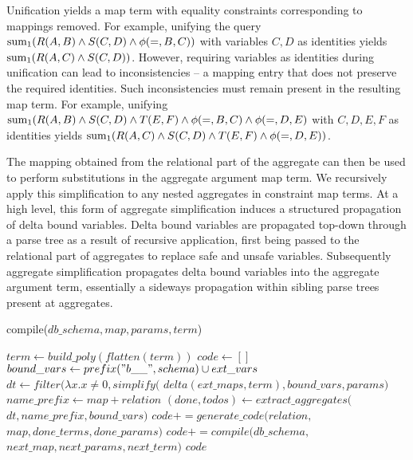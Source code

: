 Unification yields a map term with equality constraints corresponding
to mappings removed. 
For example, unifying the query
$\mathrm{sum}_{1}(R(A,B) \wedge S(C,D) \wedge \phi(=,B,C))$
with variables $C,D$ as identities yields $\mathrm{sum}_{1}(R(A,C) \wedge S(C,D))$.
However, requiring variables as identities during
unification can lead to inconsistencies -- a mapping entry that does not
preserve the required identities. Such inconsistencies must remain present in
the resulting map term.
For example, unifying
$\mathrm{sum}_{1}(R(A,B) \wedge S(C,D) \wedge T(E,F) \wedge \phi(=,B,C) \wedge
\phi(=,D,E)$ with $C,D,E,F$ as identities yields
 $\mathrm{sum}_{1}(R(A,C) \wedge S(C,D) \wedge T(E,F) \wedge \phi(=,D,E))$.

The mapping obtained from the relational part of the aggregate can then be used
to perform substitutions in the aggregate argument map term. We recursively
apply this simplification to any nested aggregates in constraint map terms.
At a high level, this form of aggregate simplification induces a structured
propagation of delta bound variables. Delta bound variables are propagated
top-down through a parse tree as a result of recursive application, first being
passed to the relational part of aggregates to replace safe and unsafe
variables. Subsequently aggregate simplification propagates delta bound
variables into the aggregate argument term, essentially a sideways propagation
within sibling parse trees present at aggregates.

\newcommand{\indentcode}{\hspace{5mm}}
\begin{algorithm}
\caption{compile($db\_schema, map, params, term$)}
\label{alg:compile}
\begin{algorithmic}[1]
  \STATE {}
  \STATE $term \leftarrow build\_poly(flatten(term))$
\ENDIF
\STATE $code \leftarrow []$
  \STATE {}
  \STATE $bound\_vars \leftarrow prefix("b\_\_", schema) \cup ext\_vars$
  \STATE $dt \leftarrow filter(\lambda x. x \neq 0, simplify($
    \STATE \indentcode $delta(ext\_maps,term),bound\_vars, params)$
  \STATE $name\_prefix \leftarrow map+relation$
  \STATE $(done, todos) \leftarrow extract\_aggregates($
    \STATE \indentcode $dt, name\_prefix, bound\_vars)$
     \STATE $code += generate\_code(relation,$
     \STATE \indentcode $map, done\_terms, done\_params)$
  \ENDFOR
  \STATE {}
  \STATE $code += compile(db\_schema, $
  \STATE \indentcode $next\_map, next\_params, next\_term)$
  \ENDFOR
\ENDFOR
\RETURN $code$
\end{algorithmic}
\end{algorithm}



